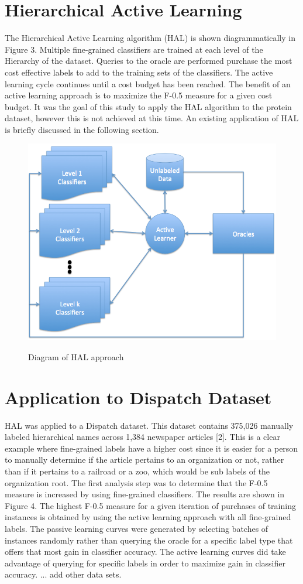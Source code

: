 \documentclass[ms]{nuthesis}
\begin{document}
\section{Hierarchical Active Learning}
\par The Hierarchical Active Learning algorithm (HAL) is shown diagrammatically in Figure 3.
Multiple fine-grained classifiers are trained at each level of the Hierarchy of the dataset.
Queries to the oracle are performed purchase the most cost effective labels to add to the
training sets of the classifiers. The active learning cycle continues until a cost budget has
been reached. The benefit of an active learning approach is to maximize the F-0.5 measure
for a given cost budget. It was the goal of this study to apply the HAL algorithm to the
protein dataset, however this is not achieved at this time. An existing application of
HAL is briefly discussed in the following section.


\FloatBarrier
\begin{figure}[!htb]
	\centering
    \includegraphics[width=0.5\columnwidth]{fig/AL2}
    \label{fig:AL2}
    \caption{Diagram of HAL approach}
\end{figure}
\FloatBarrier



\section{Application to Dispatch Dataset}
\par HAL was applied to a Dispatch dataset. This dataset contains 375,026 manually labeled
hierarchical names across 1,384 newspaper articles [2]. This is a clear example where
fine-grained labels have a higher cost since it is easier for a person to manually
determine if the article pertains to an organization or not, rather than if it pertains
to a railroad or a zoo, which would be sub labels of the organization root. The first
analysis step was to determine that the F-0.5 measure is increased by using fine-grained classifiers.
The results are shown in Figure 4. The highest F-0.5 measure for
a given iteration of purchases of training instances is obtained by using the active
learning approach with all fine-grained labels. The passive learning curves were
 generated by selecting batches of instances randomly rather than querying the
 oracle for a specific label type that offers that most gain in classifier accuracy.
 The active learning curves did take advantage of querying for specific labels in
 order to maximize gain in classifier accuracy. ... add other data sets.
\end{document}
